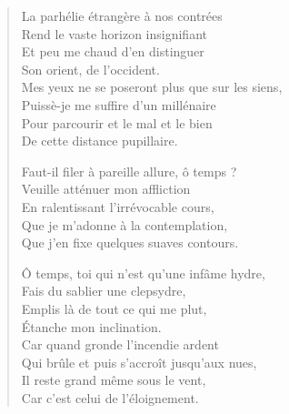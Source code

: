 \begin{verse}
  La parhélie étrangère à nos contrées\\  %
  Rend le vaste horizon insignifiant\\  %
  Et peu me chaud d’en distinguer\\  %
  Son orient, de l’occident.\\  %
  Mes yeux ne se poseront plus que sur les siens,\\  %
  Puissè-je me suffire d’un millénaire\\  %
  Pour parcourir et le mal et le bien\\  %
  De cette distance pupillaire.

  Faut-il filer à pareille allure, ô temps ?\\  %
  Veuille atténuer mon affliction\\  %
  En ralentissant l’irrévocable cours,\\  %
  Que je m’adonne à la contemplation,\\  %
  Que j’en fixe quelques suaves contours.

  Ô temps, toi qui n’est qu’une infâme hydre,\\  
  Fais du sablier une clepsydre,\\  
  Emplis là de tout ce  qui me plut,\\  
  Étanche mon inclination.\\  
  Car quand gronde l’incendie ardent\\  
  Qui brûle et puis s’accroît jusqu’aux nues,\\  
  Il reste grand même sous le vent, \\  
  Car c’est celui de l’éloignement.  



\end{verse}

